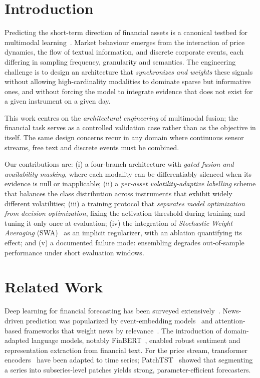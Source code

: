 \documentclass[runningheads]{llncs}
\begin{document}
\section{Introduction}
Predicting the short-term direction of financial assets is a canonical testbed
for multimodal learning~\cite{Shakeel2026,jiang2025multi}. Market behaviour emerges from the interaction of price
dynamics, the flow of textual information, and discrete corporate events, each
differing in sampling frequency, granularity and semantics. The engineering
challenge is to design an architecture that \emph{synchronizes and weights}
these signals without allowing high-cardinality modalities to dominate sparse but
informative ones, and without forcing the model to integrate evidence that does
not exist for a given instrument on a given day.

This work centres on the \emph{architectural engineering} of multimodal fusion;
the financial task serves as a controlled validation case rather than as the
objective in itself. The same design concerns recur in any domain where
continuous sensor streams, free text and discrete events must be combined.

Our contributions are: (i) a four-branch architecture with \emph{gated fusion
and availability masking}, where each modality can be differentiably silenced
when its evidence is null or inapplicable; (ii) a \emph{per-asset
volatility-adaptive labelling} scheme that balances the class distribution
across instruments that exhibit widely different volatilities; (iii) a training protocol
that \emph{separates model optimization from decision optimization}, fixing the
activation threshold during training and tuning it only once at evaluation; (iv)
the integration of \emph{Stochastic Weight Averaging} (SWA)~\cite{izmailov2018}
as an implicit regularizer, with an ablation quantifying its effect; and (v) a documented failure mode: ensembling degrades out-of-sample
performance under short evaluation windows.

\section{Related Work}
Deep learning for financial forecasting has been surveyed
extensively~\cite{sezer2020}. News-driven prediction was popularized by
event-embedding models~\cite{ding2015} and attention-based frameworks that
weight news by relevance~\cite{hu2018}. The introduction of domain-adapted
language models, notably FinBERT~\cite{yang2020,araci2019}, enabled robust
sentiment and representation extraction from financial text. For the price
stream, transformer encoders~\cite{vaswani2017} have been adapted to time series;
PatchTST~\cite{nie2023} showed that segmenting a series into subseries-level
patches yields strong, parameter-efficient forecasters.
\end{document}
